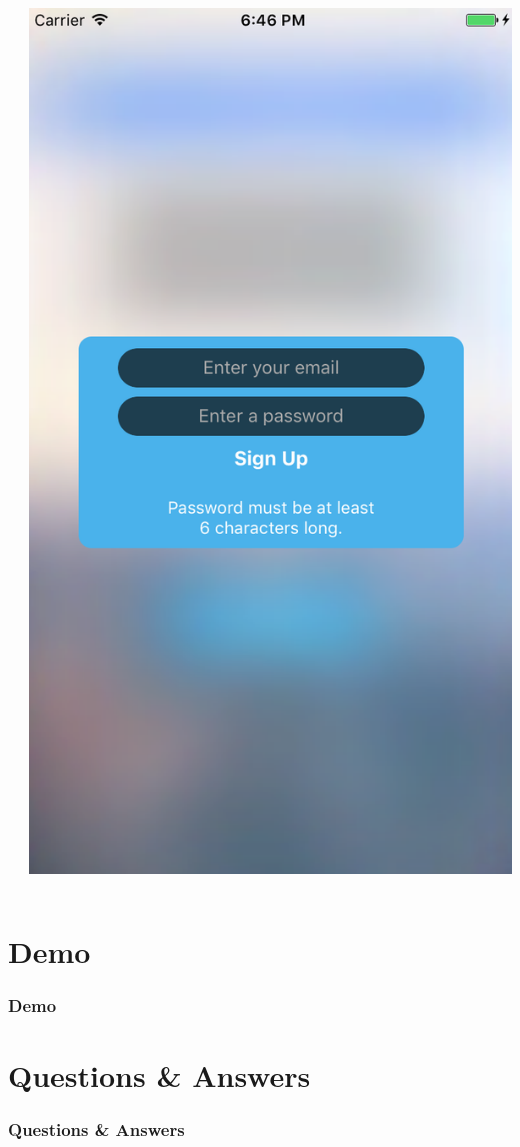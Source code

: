 \documentclass{beamer}
\begin{document}
\begin{frame}
\begin{columns}
\begin{column}{0.3\textwidth}
\begin{center}
        \end{center}
    \end{column}
    \begin{column}{0.3\textwidth}  %
        \begin{center}
            \includegraphics[scale=0.3]{registration}
        \end{center}
    \end{column}
\end{columns}
\end{frame}
\section{Demo}
\begin{frame}
\frametitle{Demo}
\end{frame}

\section{Questions \& Answers}
\begin{frame}
\frametitle{Questions \& Answers}
\end{frame}
\end{document}
